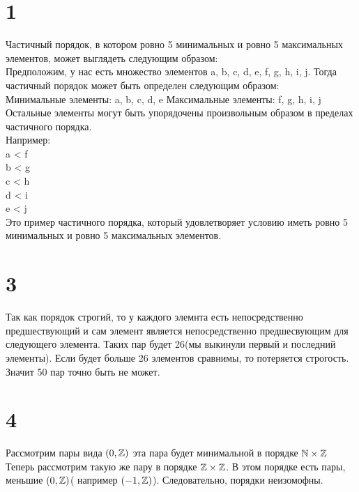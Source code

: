 

	\section*{1}
	Частичный порядок, в котором ровно 5 минимальных и ровно 5 максимальных элементов, может выглядеть следующим образом:
	\\
	Предположим, у нас есть множество элементов a, b, c, d, e, f, g, h, i, j. Тогда частичный порядок может быть определен следующим образом:\\
	
	Минимальные элементы: a, b, c, d, e
	Максимальные элементы: f, g, h, i, j
	Остальные элементы могут быть упорядочены произвольным образом в пределах частичного порядка.\\
	
	Например:\\
	 a < f\\
	 b < g \\
	 c < h \\
	 d < i\\
	 e < j \\
	
	Это пример частичного порядка, который удовлетворяет условию иметь ровно 5 минимальных и ровно 5 максимальных элементов.
	\section*{3}
	Так как порядок строгий, то у каждого элемнта есть непосредственно предшествующий и сам элемент является непосредственно предшесвующим для следующего элемента. Таких пар будет 26(мы выкинули первый и последний элементы). Если будет больше 26 элементов сравнимы, то потеряется строгость. Значит 50 пар точно быть не может.
	\section*{4}
	Рассмотрим пары вида $ (0, \mathbb{Z})$ эта пара будет минимальной в порядке $\mathbb{N} \times \mathbb{Z}$\\
	Теперь рассмотрим такую же пару в порядке $\mathbb{Z} \times \mathbb{Z}$. В этом порядке есть пары, меньшие $(0, \mathbb{Z})$( например $(-1, \mathbb{Z})$). Следовательно, порядки неизомофны.
	
	
